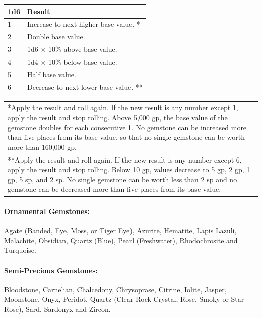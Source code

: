 \begin{multicols}{2}
\begin{minipage}{\columnwidth}
\end{minipage}

\noindent
\begin{minipage}{\columnwidth}

\label{gemvariation}
\noindent
\begin{tabular}{|p{}|p{}|}
\hline
1d6	& Result \\
\hline\hline
\rowcolor[gray]{.9}1	& Increase to next higher base value. * \\
2	& Double base value. \\
\rowcolor[gray]{.9}3	& 1d6 $\times$ 10\% above base value. \\
4	& 1d4 $\times$ 10\% below base value. \\
\rowcolor[gray]{.9}5	& Half base value. \\
6	& Decrease to next lower base value. ** \\
\hline
\end{tabular}
\noindent\begin{tabular}{p{}}
*Apply the result and roll again.  If the new result is any number except 1, apply the result and stop rolling.  Above 5,000 gp, the base value of the gemstone doubles for each consecutive 1.  No gemstone can be increased more than five places from its base value, so that no single gemstone can be worth more than 160,000 gp. \\
**Apply the result and roll again.  If the new result is any number except 6, apply the result and stop rolling.  Below 10 gp, values decrease to 5 gp, 2 gp, 1 gp, 5 sp, and 2 sp.  No single gemstone can be worth less than 2 sp and no gemstone can be decreased more than five places from its base value. \\
\end{tabular}\vspace{.5em}

\end{minipage}

\paragraph{Ornamental Gemstones:} Agate (Banded, Eye, Moss, or Tiger Eye), Azurite, Hematite, Lapis Lazuli, Malachite, Obsidian, Quartz (Blue), Pearl (Freshwater), Rhodochrosite and Turquoise.

\paragraph{Semi-Precious Gemstones:} Bloodstone, Carnelian, Chalcedony, Chrysoprase, Citrine, Iolite, Jasper, Moonstone, Onyx, Peridot, Quartz (Clear Rock Crystal, Rose, Smoky or Star Rose), Sard, Sardonyx and Zircon.
 

\end{multicols}
